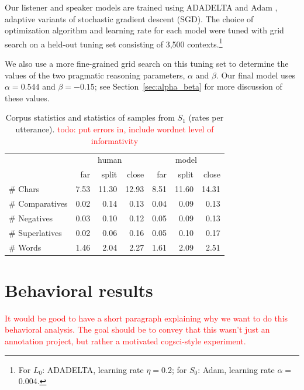 \documentclass[11pt,letterpaper]{article}
\newcommand{\Listener}{L}
\newcommand{\Speaker}{S}
\renewcommand{\|}{\mid}
\newcommand{\secref}[1]{Section~\ref{#1}}
\newcommand{\todocheck}[1]{\textcolor{red}{#1}}
\begin{document}
Our listener and speaker models are trained using ADADELTA
\cite{Zeiler2012} and Adam \cite{Kingma2014}, adaptive variants of
stochastic gradient descent (SGD). The choice of optimization
algorithm and learning rate for each model were tuned with grid search
on a held-out tuning set consisting of 3,500 contexts.\footnote{For
  $\Listener_0$: ADADELTA, learning rate $\eta = {}$0.2; for
  $\Speaker_0$: Adam, learning rate $\alpha = {}$0.004.}

We also use a more fine-grained grid search on this tuning set to determine the
values of the two pragmatic reasoning parameters, $\alpha$ and $\beta$.
Our final model uses
$\alpha = 0.544$ and $\beta = -0.15$; see \secref{sec:alpha_beta} for more
discussion of these values.

\begin{table}[ht]
\centering
\begin{tabular}{lrrr@{\hspace{38pt}}rrr}
  \toprule
  & \multicolumn{3}{c}{human}& \multicolumn{3}{c}{model}\\
  & far& split& close& far& split& close\\
  \midrule
  \# Chars & 7.53 & 11.30 & 12.93 & 8.51 & 11.60 & 14.31 \\ 
  \# Comparatives & 0.02 & 0.14 & 0.13 & 0.04 & 0.09 & 0.13 \\ 
  \# Negatives & 0.03 & 0.10 & 0.12 & 0.05 & 0.09 & 0.13 \\ 
  \# Superlatives & 0.02 & 0.06 & 0.16 & 0.05 & 0.10 & 0.17 \\ 
  \# Words & 1.46 & 2.04 & 2.27 & 1.61 & 2.09 & 2.51 \\ 
   \bottomrule
\end{tabular}
\caption{Corpus statistics and statistics of samples from $\Speaker_1$ (rates per utterance). \todocheck{todo: put errors in, include wordnet level of informativity}} \label{table:metrics}
\end{table}


\section{Behavioral results}

\todocheck{It would be good to have a short paragraph explaining why
  we want to do this behavioral analysis. The goal should be to convey
  that this wasn't just an annotation project, but rather a motivated
  cogsci-style experiment.}
\end{document}
